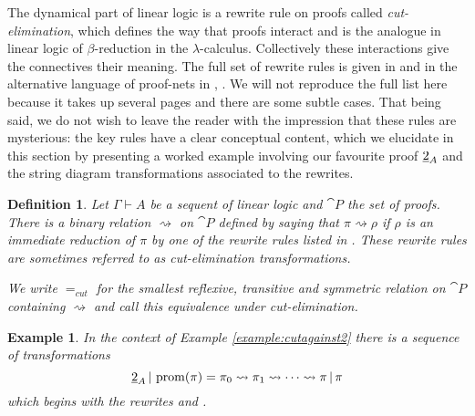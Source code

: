 \documentclass[english,letter paper,12pt,reqno]{article}
\theoremstyle{example}
\newtheorem{definition}[theorem]{Definition}
\newtheorem{example}[theorem]{Example}
\numberwithin{equation}{section}
\begin{document}
The dynamical part of linear logic is a rewrite rule on proofs called \emph{cut-elimination}, which defines the way that proofs interact and is the analogue in linear logic of $\beta$-reduction in the $\lambda$-calculus. Collectively these interactions give the connectives their meaning. The full set of rewrite rules is given in \cite[Section 3]{mellies} and in the alternative language of proof-nets in \cite[\S 4]{girard_llogic}, \cite[p.18]{pagani}. We will not reproduce the full list here because it takes up several pages and there are some subtle cases. That being said, we do not wish to leave the reader with the impression that these rules are mysterious: the key rules have a clear conceptual content, which we elucidate in this section by presenting a worked example involving our favourite proof $\underline{2}_A$ and the string diagram transformations associated to the rewrites.

\begin{definition} Let $\Gamma \vdash A$ be a sequent of linear logic and $\cat{P}$ the set of proofs. There is a binary relation $\rightsquigarrow$ on $\cat{P}$ defined by saying that $\pi \rightsquigarrow \rho$ if $\rho$ is an immediate reduction of $\pi$ by one of the rewrite rules listed in \cite[Section 3]{mellies}. These rewrite rules are sometimes referred to as \emph{cut-elimination transformations}.

We write $=_{cut}$ for the smallest reflexive, transitive and symmetric relation on $\cat{P}$ containing $\rightsquigarrow$ and call this \emph{equivalence under cut-elimination}.
\end{definition}


\begin{example}
In the context of Example \ref{example:cutagainst2} there is a sequence of transformations
\[
\underline{2}_A \,|\, \operatorname{prom}( \pi ) = \pi_0 \rightsquigarrow \pi_1 \rightsquigarrow \cdots \rightsquigarrow \pi \,|\, \pi
\]
which begins with the rewrites \cite[\S 3.9.3]{mellies} and \cite[\S 3.9.1]{mellies}.
\end{example}
\end{document}

